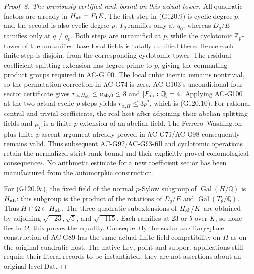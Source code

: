 \begin{proof}
\emph{8. The previously certified rank bound on this actual tower.}
All quadratic factors are already in $H_{\rm ab}=F_1E$.
The first step in (G120.9) is cyclic degree $p$, and the
second is also cyclic degree $p$: $T_\theta$ ramifies only
at $q_0$, whereas $D_q/E$ ramifies only at $q\ne q_0$.
Both steps are unramified at $p$, while the cyclotomic
$\mathbb Z_p$-tower of the unramified base local fields is
totally ramified there.  Hence each finite step is disjoint
from the corresponding cyclotomic tower.
The residual coefficient splitting extension has degree
prime to $p$, giving the commuting product groups required
in AC-G100.  The local cubic inertia remains nontrivial,
so the permutation correction in AC-G74 is zero.
AC-G103's unconditional four-sector certificate gives
$r_{\alpha,H_{\rm ab}}\le a_{{\rm ab},0}\le3$ and
$[F_{\rm ab}:\mathbb Q]=4$.
Applying AC-G100 at the two actual cyclic-$p$ steps yields
$r_{\alpha,H}\le3p^2$, which is (G120.10).
For rational central and trivial coefficients, the real
host after adjoining their abelian splitting fields and
$\mu_p$ is a finite $p$-extension of an abelian field.
The Ferrero--Washington plus finite-$p$ ascent argument
already proved in AC-G76/AC-G98 consequently remains valid.
Thus subsequent AC-G92/AC-G93-fill and cyclotomic operations
retain the normalized strict-rank bound and their explicitly
proved cohomological consequences.
No arithmetic estimate for a new coefficient sector has
been manufactured from the automorphic construction.

For (G120.9a), the fixed field of the normal $p$-Sylow
subgroup of $\operatorname{Gal}(H/\mathbb Q)$ is
$H_{\rm ab}$: this subgroup is the product of
the rotations of $D_q/E$ and $\operatorname{Gal}(T_\theta/\mathbb Q)$.
Thus $H\cap\Omega\subset H_{\rm ab}$.
The three quadratic subextensions of $H_{\rm ab}/K$
are obtained by adjoining $\sqrt{-23},\sqrt5$, and
$\sqrt{-115}$.  Each ramifies at $23$ or $5$ over $K$,
so none lies in $\Omega$; this proves the equality.
Consequently the scalar auxiliary-place construction of
AC-G89 has the same actual finite-field compatibility on
$H$ as on the original quadratic host.  The native
$\mathrm{Lev}$, point and support applications still
require their literal records to be instantiated; they
are not assertions about an original-level $\mathrm{Dat}$.
\end{proof}

